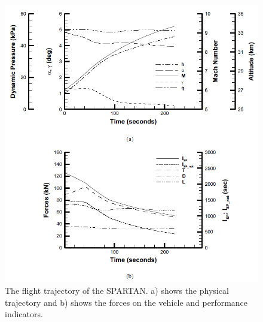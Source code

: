 \begin{figure}[!ht]
	\centering
	\includegraphics[width=0.9\linewidth]{figures/2_literature-review/SPARTAN_traj1}
	\caption{The flight trajectory of the SPARTAN. a) shows the physical trajectory and b) shows the forces on the vehicle and performance indicators.}
	\label{fig:SPARTAN_traj}
\end{figure}


